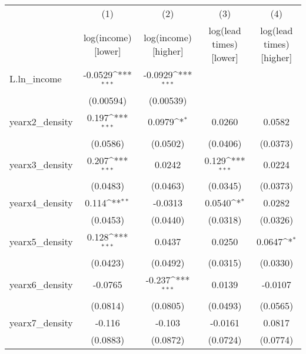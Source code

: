 {
\def\sym#1{\ifmmode^{#1}\else\(^{#1}\)\fi}
\begin{tabular}{l*{4}{c}}
\toprule
            &\multicolumn{1}{c}{(1)}&\multicolumn{1}{c}{(2)}&\multicolumn{1}{c}{(3)}&\multicolumn{1}{c}{(4)}\\
            &\multicolumn{1}{c}{log(income) [lower]}&\multicolumn{1}{c}{log(income) [higher]}&\multicolumn{1}{c}{log(lead times) [lower]}&\multicolumn{1}{c}{log(lead times) [higher]}\\
\midrule
L.ln\_income &     -0.0529\sym{***}&     -0.0929\sym{***}&                     &                     \\
            &   (0.00594)         &   (0.00539)         &                     &                     \\
\addlinespace
yearx2\_density&       0.197\sym{***}&      0.0979\sym{*}  &      0.0260         &      0.0582         \\
            &    (0.0586)         &    (0.0502)         &    (0.0406)         &    (0.0373)         \\
\addlinespace
yearx3\_density&       0.207\sym{***}&      0.0242         &       0.129\sym{***}&      0.0224         \\
            &    (0.0483)         &    (0.0463)         &    (0.0345)         &    (0.0373)         \\
\addlinespace
yearx4\_density&       0.114\sym{**} &     -0.0313         &      0.0540\sym{*}  &      0.0282         \\
            &    (0.0453)         &    (0.0440)         &    (0.0318)         &    (0.0326)         \\
\addlinespace
yearx5\_density&       0.128\sym{***}&      0.0437         &      0.0250         &      0.0647\sym{*}  \\
            &    (0.0423)         &    (0.0492)         &    (0.0315)         &    (0.0330)         \\
\addlinespace
yearx6\_density&     -0.0765         &      -0.237\sym{***}&      0.0139         &     -0.0107         \\
            &    (0.0814)         &    (0.0805)         &    (0.0493)         &    (0.0565)         \\
\addlinespace
yearx7\_density&      -0.116         &      -0.103         &     -0.0161         &      0.0817         \\
            &    (0.0883)         &    (0.0872)         &    (0.0724)         &    (0.0774)         \\

\end{tabular}}
